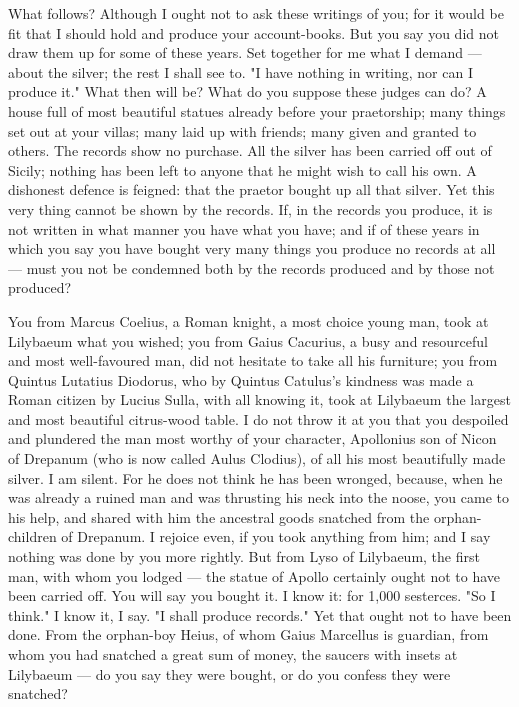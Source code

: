  What follows? Although I ought not to ask these writings of you; for it would be fit that I should hold and produce your account-books. But you say you did not draw them up for some of these years. Set together for me what I demand --- about the silver; the rest I shall see to. "I have nothing in writing, nor can I produce it." What then will be? What do you suppose these judges can do? A house full of most beautiful statues already before your praetorship; many things set out at your villas; many laid up with friends; many given and granted to others. The records show no purchase. All the silver has been carried off out of Sicily; nothing has been left to anyone that he might wish to call his own. A dishonest defence is feigned: that the praetor bought up all that silver. Yet this very thing cannot be shown by the records. If, in the records you produce, it is not written in what manner you have what you have; and if of these years in which you say you have bought very many things you produce no records at all --- must you not be condemned both by the records produced and by those not produced?

 You from Marcus Coelius, a Roman knight, a most choice young man, took at Lilybaeum what you wished; you from Gaius Cacurius, a busy and resourceful and most well-favoured man, did not hesitate to take all his furniture; you from Quintus Lutatius Diodorus, who by Quintus Catulus's kindness was made a Roman citizen by Lucius Sulla, with all knowing it, took at Lilybaeum the largest and most beautiful citrus-wood table. I do not throw it at you that you despoiled and plundered the man most worthy of your character, Apollonius son of Nicon of Drepanum (who is now called Aulus Clodius), of all his most beautifully made silver. I am silent. For he does not think he has been wronged, because, when he was already a ruined man and was thrusting his neck into the noose, you came to his help, and shared with him the ancestral goods snatched from the orphan-children of Drepanum. I rejoice even, if you took anything from him; and I say nothing was done by you more rightly. But from Lyso of Lilybaeum, the first man, with whom you lodged --- the statue of Apollo certainly ought not to have been carried off. You will say you bought it. I know it: for 1,000 sesterces. "So I think." I know it, I say. "I shall produce records." Yet that ought not to have been done. From the orphan-boy Heius, of whom Gaius Marcellus is guardian, from whom you had snatched a great sum of money, the saucers with insets at Lilybaeum --- do you say they were bought, or do you confess they were snatched?

